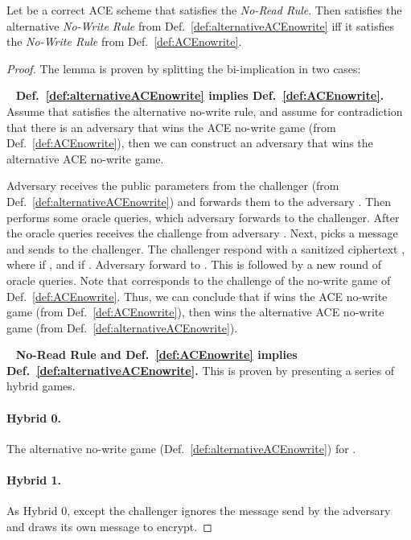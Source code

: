 \documentclass{llncs}
\begin{document}
\newcommand{\ACEscheme}{\mathsf{ACE}}
\begin{lem} \label{lem:nowrite_equiv}
Let  be a correct ACE scheme that satisfies the \emph{No-Read Rule}. Then  satisfies the alternative \emph{No-Write Rule} from Def.~\ref{def:alternativeACEnowrite} iff it satisfies the \emph{No-Write Rule} from Def.~\ref{def:ACEnowrite}.
\end{lem}

\setcounter{claimcounter}{0}
\begin{proof}
The lemma is proven by splitting the bi-implication in two cases:

\ \newline
\noindent\textbf{Def.~\ref{def:alternativeACEnowrite} implies Def.~\ref{def:ACEnowrite}.}
Assume that  satisfies the alternative no-write rule, and assume for contradiction that there is an adversary  that wins the ACE no-write game (from Def.~\ref{def:ACEnowrite}), then we can construct an adversary  that wins the alternative ACE no-write game.

Adversary  receives the public parameters from the challenger (from Def.~\ref{def:alternativeACEnowrite}) and forwards them to the adversary . Then  performs some oracle queries, which adversary  forwards to the challenger. After the oracle queries  receives the challenge  from adversary . Next,  picks a message  and sends  to the challenger. 
The challenger respond with a sanitized ciphertext , where  if , and  if .
Adversary  forward  to . This is followed by a new round of oracle queries. Note that  corresponds to the challenge of the no-write game of Def.~\ref{def:ACEnowrite}.
Thus, we can conclude that if  wins the ACE no-write game (from Def.~\ref{def:ACEnowrite}), then  wins the alternative ACE no-write game (from Def.~\ref{def:alternativeACEnowrite}).

\ \newline
\noindent\textbf{No-Read Rule and Def.~\ref{def:ACEnowrite} implies Def.~\ref{def:alternativeACEnowrite}.}
This is proven by presenting a series of hybrid games.

\paragraph{Hybrid 0.} The alternative no-write game (Def.~\ref{def:alternativeACEnowrite}) for .

\paragraph{Hybrid 1.} As Hybrid 0, except the challenger ignores the message  send by the adversary and draws its own message  to encrypt.


\end{proof}
\end{document}

